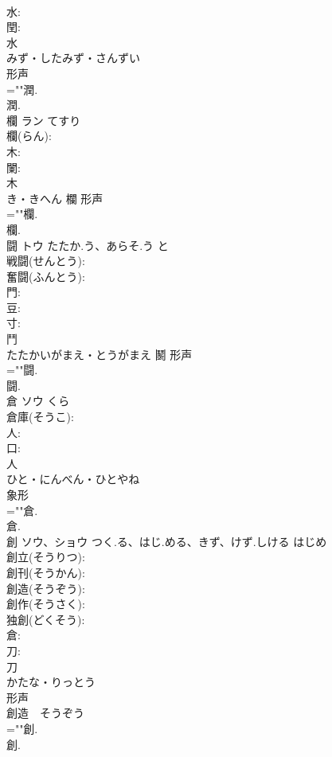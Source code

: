\documentclass[8pt]{extreport}
\begin{document}
\begin{CJK}{UTF8}{min}
\\	水: 
\\	閏: 
\\	水	
\\	みず・したみず・さんずい	
\\	形声 
\\	=""潤.
\\	潤.
\\	欄	ラン	てすり		
\\	欄(らん): 
\\	木: 
\\	闌: 
\\	木	
\\	き・きへん	欄	形声 
\\	=""欄.
\\	欄.
\\	闘	トウ	たたか.う、あらそ.う	と	
\\	戦闘(せんとう): 
\\	奮闘(ふんとう): 
\\	門: 
\\	豆: 
\\	寸: 
\\	鬥	
\\	たたかいがまえ・とうがまえ	鬭	形声 
\\	=""闘.
\\	闘.
\\	倉	ソウ	くら		
\\	倉庫(そうこ): 
\\	人: 
\\	口: 
\\	人	
\\	ひと・にんべん・ひとやね	
\\	象形 
\\	=""倉.
\\	倉.
\\	創	ソウ、ショウ	つく.る、はじ.める、きず、けず.しける	はじめ	
\\	創立(そうりつ): 
\\	創刊(そうかん): 
\\	創造(そうぞう): 
\\	創作(そうさく): 
\\	独創(どくそう): 
\\	倉: 
\\	刀: 
\\	刀	
\\	かたな・りっとう	
\\	形声 
\\	創造　そうぞう 
\\	=""創.
\\	創.

\end{CJK}
\end{document}
